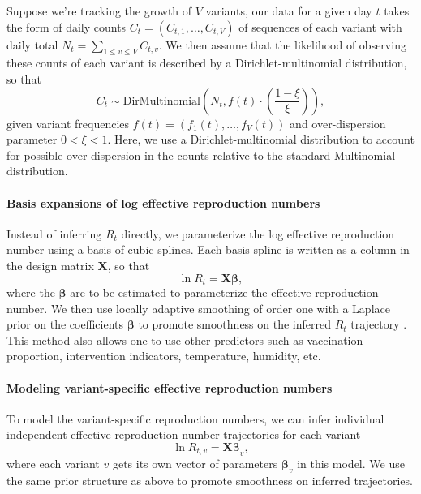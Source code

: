 \documentclass[11pt,oneside,letterpaper]{article}
\renewcommand{\vec}[1]{\boldsymbol{#1}}
\begin{document}
Suppose we're tracking the growth of $V$ variants, our data for a given day $t$ takes the form of daily counts $C_{t} = (C_{t,1}, \ldots, C_{t,V})$ of sequences of each variant with daily total $N_{t} = \sum_{1\leq v \leq V} C_{t, v}$.
We then assume that the likelihood of observing these counts of each variant is described by a Dirichlet-multinomial distribution, so that
\begin{equation}
    C_{t} \sim \text{DirMultinomial}\left(N_{t}, f(t)\cdot \left(\frac{1-\xi}{\xi}\right)\right),
\end{equation}
given variant frequencies $f(t) = (f_{1}(t), \ldots, f_{V}(t))$ and over-dispersion parameter $0<\xi<1$.
Here, we use a Dirichlet-multinomial distribution to account for possible over-dispersion in the counts relative to the standard Multinomial distribution.

\paragraph{Basis expansions of log effective reproduction numbers}%

Instead of inferring $R_{t}$ directly, we parameterize the log effective reproduction number using a basis of cubic splines.
Each basis spline is written as a column in the design matrix $\vec{X}$, so that
\begin{equation}
  \ln R_{t} = \vec{X} \vec{\beta},
\end{equation}
where the $\vec{\beta}$ are to be estimated to parameterize the effective reproduction number.
We then use locally adaptive smoothing of order one with a Laplace prior on the coefficients $\vec{\beta}$ to promote smoothness on the inferred $R_t$ trajectory \cite{Faulkner2018}.
This method also allows one to use other predictors such as vaccination proportion, intervention indicators, temperature, humidity, etc.


\paragraph{Modeling variant-specific effective reproduction numbers}%

To model the variant-specific reproduction numbers, we can infer individual independent effective reproduction number trajectories for each variant
\begin{equation}
  \ln R_{t, v} = \vec{X} \vec{\beta}_{v},
\end{equation}
where each variant $v$ gets its own vector of parameters $\vec{\beta}_{v}$ in this model.
We use the same prior structure as above to promote smoothness on inferred trajectories.
\end{document}
